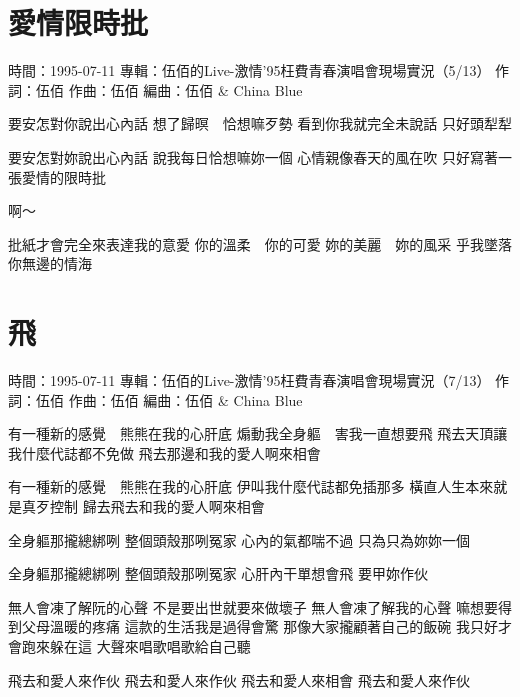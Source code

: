 \documentclass[UTF8,a4paper,oneside,twocolumn,12pt]{ctexbook}
\newcommand{\infopair}[2]{\textbullet #1：#2}
\newcommand{\zc}[1][伍佰]{\infopair{作詞}{#1}}
\newcommand{\zq}[1][伍佰]{\infopair{作曲}{#1}}
\newcommand{\bq}[1][伍佰]{\infopair{編曲}{#1}}
\newcommand{\zj}[1]{\infopair{專輯}{#1}}
\newcommand{\sj}[1]{\infopair{時間}{#1}}
\newenvironment{info}{\begin{flushleft}\kaishu
	}
	{\end{flushleft}\normalsize\yahei\par}
\newenvironment{lyric}{
	}
{}
\begin{document}
\section{愛情限時批}
\begin{info}
	\sj{1995-07-11}
	\zj{伍佰的Live-激情'95枉費青春演唱會現場實況（5/13）}
	\zc
	\zq
	\bq[伍佰 \& China Blue]
\end{info}
\begin{lyric}
	要安怎對你說出心內話
	想了歸暝　恰想嘛歹勢
	看到你我就完全未說話
	只好頭犁犁

	要安怎對妳說出心內話
	說我每日恰想嘛妳一個
	心情親像春天的風在吹
	只好寫著一張愛情的限時批

	啊～

	批紙才會完全來表達我的意愛
	你的溫柔　你的可愛  妳的美麗　妳的風采
	乎我墜落你無邊的情海
\end{lyric}

\section{飛}
\begin{info}
	\sj{1995-07-11}
	\zj{伍佰的Live-激情'95枉費青春演唱會現場實況（7/13）}
	\zc
	\zq
	\bq[伍佰 \& China Blue]
\end{info}
\begin{lyric}
	有一種新的感覺　熊熊在我的心肝底
	煽動我全身軀　害我一直想要飛
	飛去天頂讓我什麼代誌都不免做
	飛去那邊和我的愛人啊來相會

	有一種新的感覺　熊熊在我的心肝底
	伊叫我什麼代誌都免插那多
	橫直人生本來就是真歹控制
	歸去飛去和我的愛人啊來相會

	全身軀那攏總綁咧
	整個頭殼那咧冤家
	心內的氣都喘不過
	只為只為妳妳一個

	全身軀那攏總綁咧
	整個頭殼那咧冤家
	心肝內干單想會飛
	要甲妳作伙

	無人會凍了解阮的心聲
	不是要出世就要來做壞子
	無人會凍了解我的心聲
	嘛想要得到父母溫暖的疼痛
	這款的生活我是過得會驚
	那像大家攏顧著自己的飯碗
	我只好才會跑來躲在這
	大聲來唱歌唱歌給自己聽

	飛去和愛人來作伙
	飛去和愛人來作伙
	飛去和愛人來相會
	飛去和愛人來作伙
\end{lyric}
\end{document}
